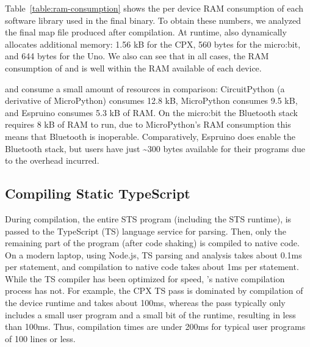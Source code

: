 Table~\ref{table:ram-consumption} shows the per device RAM consumption of each software library used in the final \MC binary. To obtain these numbers, we analyzed the final map file produced after compilation. At runtime, \MC also dynamically allocates additional memory: 1.56 kB for the CPX, 560 bytes for the micro:bit, and 644 bytes for the Uno. We also can see that in all cases, the RAM consumption of \MC and \CO is well within the RAM available of each device.

\MC and \CO consume a small amount of resources in comparison: CircuitPython (a derivative of MicroPython) consumes 12.8 kB, MicroPython consumes 9.5 kB, and Espruino consumes 5.3 kB of RAM. On the micro:bit the Bluetooth stack requires 8 kB of RAM to run, due to MicroPython's RAM consumption this means that Bluetooth is inoperable. Comparatively, Espruino does enable the Bluetooth stack, but users have just \textasciitilde300 bytes available for their programs due to the overhead incurred.





\subsection{Compiling Static TypeScript}

During compilation, the entire STS program (including the STS runtime), is passed to the TypeScript (TS) language service for parsing. Then, only the remaining part of the program (after code shaking) is compiled to native code. On a modern laptop, using Node.js, TS parsing and analysis takes about 0.1ms per statement, and \MC compilation to native code takes about 1ms per statement.
While the TS compiler has been optimized for speed, \MCN's native compilation process has not. For example, the CPX TS pass is dominated by compilation of the device runtime and takes about 100ms, whereas the \MC pass typically only includes a small user program and a small bit of the runtime, resulting in less than 100ms. Thus, compilation times are under 200ms for typical user programs of 100 lines or less.

